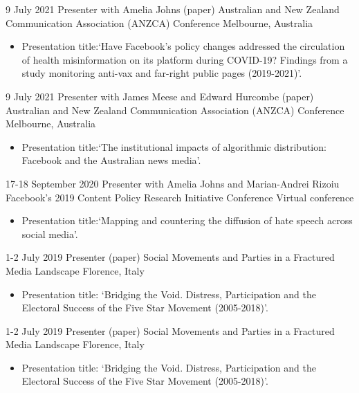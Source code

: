 \documentclass[11pt,a4paper,sans]{moderncv}
\begin{document}
\cventry %
{9 July 2021}
{Presenter with Amelia Johns (paper)}
{Australian and New Zealand Communication Association (ANZCA) Conference}
{Melbourne, Australia}
{}
       {
      \begin{itemize} %
        \item {Presentation title:`Have Facebook's policy changes
            addressed the circulation of health misinformation on its
            platform during COVID-19? Findings from a study monitoring
            anti-vax and far-right public pages (2019-2021)'.}
      \end{itemize}
    }

\cventry %
{9 July 2021}
{Presenter with James Meese and Edward Hurcombe (paper)}
{Australian and New Zealand Communication Association (ANZCA) Conference}
{Melbourne, Australia}
{}
       {
      \begin{itemize} %
        \item {Presentation title:`The institutional impacts of algorithmic distribution: Facebook and the Australian news media'.}
      \end{itemize}
    }


\cventry
{17-18 September 2020}
{Presenter with Amelia Johns and Marian-Andrei Rizoiu}
{Facebook's 2019 Content Policy Research Initiative Conference}
{Virtual conference}
{}
       {
      \begin{itemize} %
        \item {Presentation title:`Mapping and countering the diffusion of hate speech across social media'.}
      \end{itemize}
    }


\cventry
    {1-2 July 2019} %
    {Presenter (paper)} %
    {Social Movements and Parties in a Fractured Media Landscape} %
    {Florence, Italy} %
        {}
        {
      \begin{itemize} %
        \item {Presentation title: `Bridging the Void. Distress, Participation and the
Electoral Success of the Five Star Movement (2005-2018)'.}
      \end{itemize}
    }


    \cventry
        {1-2 July 2019} 
    {Presenter (paper)} %
    {Social Movements and Parties in a Fractured Media Landscape} %
    {Florence, Italy} %
        {}
    {
      \begin{itemize} %
        \item {Presentation title: `Bridging the Void. Distress, Participation and the
Electoral Success of the Five Star Movement (2005-2018)'.}
      \end{itemize}
    }
 
\end{document}
